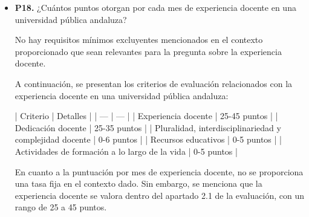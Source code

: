 \documentclass{article}
\begin{document}
\begin{itemize}
\begin{respuesta_agente}
La puntuación máxima en el apartado de Actividad Investigadora no se especifica directamente en el contexto proporcionado. Sin embargo, se menciona que en el caso de PTU, se reconocerá automáticamente el mínimo exigido de actividad investigadora a quienes hayan obtenido un sexenio de investigación CNEAI-ANECA, y el máximo con dos sexenios de investigación. En el caso de CU, se reconocerá automáticamente el mínimo exigido de actividad investigadora a quienes hayan obtenido tres sexenios de investigación CNEAI-ANECA y el máximo a quienes hayan obtenido cuatro; cada sexenio de investigación se valorará con 10 puntos.

Además, se menciona que la participación durante 3 años como IP en convocatorias competitivas estatales podrá ser valorada con 10 puntos, mientras que la participación como miembro del equipo en las mismas condiciones podrá ser valorada con 2 puntos.

En resumen, la puntuación máxima en el apartado de Actividad Investigadora dependerá de los méritos y contribuciones presentados por el candidato, y se calculará según los criterios de evaluación y puntuación establecidos en el baremo.
    \end{respuesta_agente}
    \vspace{0.2cm}
    \noindent\textbf{Documentos recuperados:} No se detectaron fuentes.

  \item \textbf{P18.} ¿Cuántos puntos otorgan por cada mes de experiencia docente en una universidad pública andaluza? \\
    \begin{respuesta_agente}
      No hay requisitos mínimos excluyentes mencionados en el contexto proporcionado que sean relevantes para la pregunta sobre la experiencia docente.

A continuación, se presentan los criterios de evaluación relacionados con la experiencia docente en una universidad pública andaluza:

| Criterio | Detalles |
| --- | --- |
| Experiencia docente | 25-45 puntos |
| Dedicación docente | 25-35 puntos |
| Pluralidad, interdisciplinariedad y complejidad docente | 0-6 puntos |
| Recursos educativos | 0-5 puntos |
| Actividades de formación a lo largo de la vida | 0-5 puntos |

En cuanto a la puntuación por mes de experiencia docente, no se proporciona una tasa fija en el contexto dado. Sin embargo, se menciona que la experiencia docente se valora dentro del apartado 2.1 de la evaluación, con un rango de 25 a 45 puntos.


\end{respuesta_agente}
\end{itemize}
\end{document}
